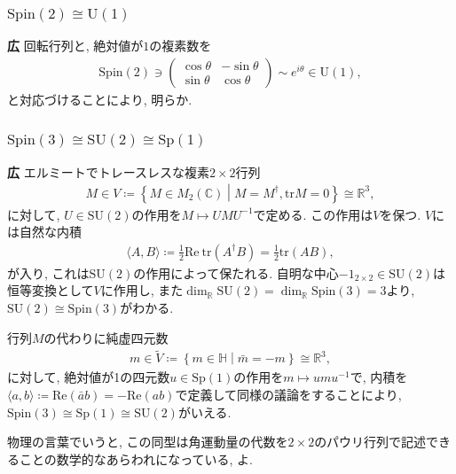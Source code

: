 \documentclass{ltjsarticle}
\theoremstyle{definition}
\begin{document}
\subsubsection{$\mathrm{Spin}(2)\cong\mathrm U(1)$}
\noindent
\textbf{広} 回転行列と, 絶対値が$1$の複素数を
\begin{align}
\mathrm{Spin}(2)\ni
\begin{pmatrix}
\cos\theta&-\sin\theta\\
\sin\theta&\cos\theta
\end{pmatrix}
\sim e^{i\theta}\in\mathrm{U}(1),
\end{align}
と対応づけることにより, 明らか.

\subsubsection{$\mathrm{Spin}(3)\cong\mathrm{SU}(2)\cong\mathrm{Sp}(1)$}
\noindent
\textbf{広} エルミートでトレースレスな複素$2\times2$行列
\begin{align}
M\in V\coloneqq\left\{M\in M_2(\mathbb C)\middle|M=M^\dagger, \mathrm{tr}M=0\right\}\cong\mathbb R^3,
\end{align}
に対して, $U\in\mathrm{SU}(2)$の作用を$M\mapsto UMU^{-1}$で定める. この作用は$V$を保つ. $V$には自然な内積
\begin{align}
\langle A,B\rangle\coloneqq\frac12\mathrm{Re}\ \mathrm{tr}\left(A^\dagger B\right)=\frac12\mathrm{tr}(AB),
\end{align}
が入り, これは$\mathrm{SU}(2)$の作用によって保たれる. 自明な中心$-1_{2\times2}\in\mathrm{SU}(2)$は恒等変換として$V$に作用し, また$\dim_{\mathbb{R}}\mathrm{SU}(2)=\dim_{\mathbb R}\mathrm{Spin}(3)=3$より, $\mathrm{SU}(2)\cong\mathrm{Spin}(3)$がわかる.\par
行列$M$の代わりに純虚四元数
\begin{align}
m\in\tilde V\coloneqq\left\{m\in\mathbb H\middle|\bar m=-m\right\}\cong\mathbb R^3,
\end{align}
に対して, 絶対値が1の四元数$u\in\mathrm{Sp}(1)$の作用を$m\mapsto umu^{-1}$で, 内積を$\langle a,b\rangle\coloneqq\mathrm{Re}(\bar ab)=-\mathrm{Re}(ab)$で定義して同様の議論をすることにより, $\mathrm{Spin}(3)\cong\mathrm{Sp}(1)\cong\mathrm{SU}(2)$がいえる.\par
物理の言葉でいうと, この同型は角運動量の代数を$2\times2$のパウリ行列で記述できることの数学的なあらわれになっている, よ.
\end{document}

